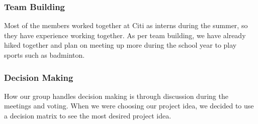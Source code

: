 \documentclass{article}
\begin{document}
\subsubsection*{Team Building}

Most of the members worked together at Citi as interns during the summer, so they have experience working together. As per team building, we have already hiked together and plan on meeting up more during the school year to play sports such as badminton. 

\subsubsection*{Decision Making} 

How our group handles decision making is through discussion during the meetings and voting. When we were choosing our project idea, we decided to use a decision matrix to see the most desired project idea. 
\end{document}
